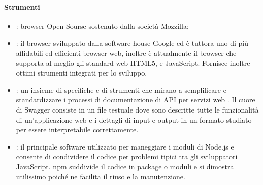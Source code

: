 \documentclass[../NormeDiProgetto_v3.0.0.tex]{subfiles}
\begin{document}
			\paragraph{Strumenti}
			\begin{itemize}
				\item \textbf{}: browser Open Sourse sostenuto dalla società Mozzilla;

				\item \textbf{}: il browser sviluppato dalla software house Google ed è tuttora uno di più affidabili ed efficienti browser web, inoltre è attualmente il browser che supporta al meglio gli standard web HTML5,  e JavaScript. Fornisce inoltre ottimi strumenti integrati per lo sviluppo.

				\item \textbf{}: un insieme di specifiche e di strumenti che mirano a semplificare e standardizzare i processi di documentazione di API per servizi web . Il cuore di Swagger consiste in un file testuale dove sono descritte tutte le funzionalità di un'applicazione web e i dettagli di input e output in un formato studiato per essere interpretabile correttamente.

				\item \textbf{}: il principale software utilizzato per maneggiare i moduli di Node.js e consente di condividere il codice per problemi tipici tra gli sviluppatori JavaScript. npm suddivide il codice in package o moduli e si dimostra utilissimo poiché ne facilita il riuso e la manutenzione.


			


\end{itemize}
\end{document}
